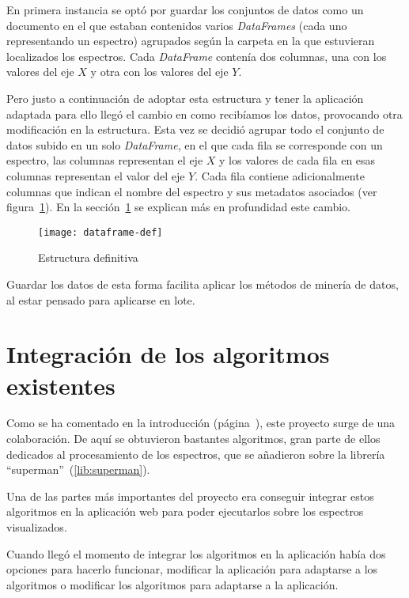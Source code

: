 En primera instancia se optó por guardar los conjuntos de datos como un
documento en el que estaban contenidos varios \textit{DataFrames} (cada uno
representando un espectro) agrupados según la carpeta en la que estuvieran
localizados los espectros. Cada \textit{DataFrame} contenía dos columnas, una
con los valores del eje $X$ y otra con los valores del eje $Y$.

Pero justo a continuación de adoptar esta estructura y tener la aplicación
adaptada para ello llegó el cambio en como recibíamos los datos, provocando otra
modificación en la estructura. Esta vez se decidió agrupar todo el conjunto de
datos subido en un solo \textit{DataFrame}, en el que cada fila se corresponde
con un espectro, las columnas representan el eje $X$ y los valores de cada fila 
en esas columnas representan el valor del eje $Y$. Cada fila contiene 
adicionalmente columnas que indican el nombre del espectro y sus metadatos 
asociados (ver figura~\ref{fig:dataframe-def}). En la 
sección~\ref{sec:integracion} se explican más en profundidad este cambio.

\begin{figure}[!h]
	\centering
	\texttt{[image: dataframe-def]}
	\caption{Estructura definitiva}\label{fig:dataframe-def}
\end{figure}

Guardar los datos de esta forma facilita aplicar los métodos de minería de datos,
al estar pensado para aplicarse en lote.


\section{Integración de los algoritmos existentes}\label{sec:integracion}

Como se ha comentado en la introducción (página~\pageref{ch:introduccion}), este
proyecto surge de una colaboración. De aquí se obtuvieron bastantes algoritmos,
gran parte de ellos dedicados al procesamiento de los espectros, que se
añadieron sobre la librería ``superman''~(\ref{lib:superman}).

Una de las partes más importantes del proyecto era conseguir integrar estos
algoritmos en la aplicación web para poder ejecutarlos sobre los espectros
visualizados.

Cuando llegó el momento de integrar los algoritmos en la aplicación había dos
opciones para hacerlo funcionar, modificar la aplicación para adaptarse a los
algoritmos o modificar los algoritmos para adaptarse a la aplicación.

